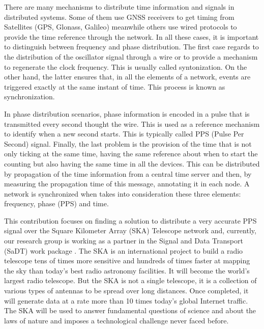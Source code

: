 There are many mechanisms to distribute time information and signals in distributed systems. Some of them use GNSS  receivers to get timing from Satellites (GPS, Glonass, 
Galileo) meanwhile others use wired protocols to provide the time reference 
through the network. In all these cases, it is important to distinguish between frequency and phase distribution.
The first case regards to the distribution of the oscillator signal through a wire or to provide a mechanism to regenerate the clock frequency. This is usually  called syntonization. On the other hand, the latter ensures that, in all the elements of a network, events are triggered exactly at the same instant of time. This process is known as synchronization. 

In phase distribution scenarios, phase information is encoded in a pulse that is transmitted every second thought the wire. This is used as a reference mechanism to identify when a new second starts. This is typically called PPS (Pulse Per Second) signal. Finally, the last problem is the provision of the time that is not only ticking at the same time, having the same reference about when to start the counting but also having the same time in all the devices. This can be distributed by propagation of the time information from a central time server and then, by measuring the propagation time of this message, annotating it in each node. A network is synchronized when takes into consideration these three elements: frequency, phase (PPS) and time. 

This contribution focuses on finding a solution to distribute a very accurate PPS 
signal over the Square Kilometer Array (SKA) Telescope  network
\cite{ska:project_website} and, currently, our research group is working as a partner in the Signal and Data Transport (SaDT) \cite{ska:sadt_website} work package . The SKA is an international project to build a radio 
telescope tens of times more sensitive and hundreds of times faster at mapping 
the sky than today’s best radio astronomy facilities. It will become the 
world’s largest radio telescope. But the SKA is not a single telescope, it is a 
collection of various types of antennas to be spread over long distances. Once 
completed, it will generate data at a rate more than 10 times today’s global 
Internet traffic. The SKA will be used to answer fundamental questions of 
science and about the laws of nature and imposes a technological challenge 
never faced before.

